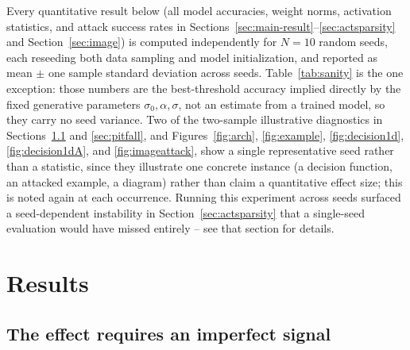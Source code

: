 \documentclass[11pt]{article}
\begin{document}
Every quantitative result below (all model accuracies, weight norms,
activation statistics, and attack success rates in
Sections~\ref{sec:main-result}--\ref{sec:actsparsity} and
Section~\ref{sec:image}) is computed independently for $N=10$ random seeds,
each reseeding both data sampling and model initialization, and reported as
mean $\pm$ one sample standard deviation across seeds. Table~\ref{tab:sanity}
is the one exception: those numbers are the best-threshold accuracy implied
directly by the fixed generative parameters $\sigma_0,\alpha,\sigma$, not an
estimate from a trained model, so they carry no seed variance. Two of the
two-sample illustrative diagnostics in Sections~\ref{sec:pilot} and
\ref{sec:pitfall}, and Figures~\ref{fig:arch}, \ref{fig:example},
\ref{fig:decision1d}, \ref{fig:decision1dA}, and \ref{fig:imageattack}, show
a single representative seed rather than a statistic, since they illustrate
one concrete instance (a decision function, an attacked example, a
diagram) rather than claim a quantitative effect size; this is noted again
at each occurrence. Running this experiment across seeds surfaced a
seed-dependent instability in Section~\ref{sec:actsparsity} that a
single-seed evaluation would have missed entirely -- see that section for
details.

\section{Results}

\subsection{The effect requires an imperfect signal}
\label{sec:pilot}
\end{document}
